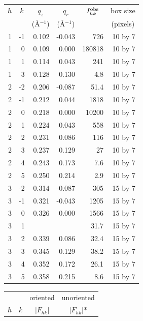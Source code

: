 \begin{table}[htbp]
  \centering
  \begin{tabular}{rrrrrr}
    \hline
    \multicolumn{1}{c}{$h$} & \multicolumn{1}{c}{$k$} & \multicolumn{1}{c}{$q_z$} & \multicolumn{1}{c}{$q_r$} & \multicolumn{1}{c}{$I_{hk}^\textrm{obs}$} & \multicolumn{1}{c}{box size} \\
     & & \multicolumn{1}{c}{(\AA$^{-1}$)} & \multicolumn{1}{c}{(\AA$^{-1}$)} & & \multicolumn{1}{c}{(pixels)} \\ 
    \hline
    1 & -1 & 0.102 & -0.043 &    726 & 10 by 7 \\
    1 &  0 & 0.109 &  0.000 & 180818 & 10 by 7 \\
    1 &  1 & 0.114 &  0.043 &    241 & 10 by 7 \\
    1 &	 3 & 0.128 &	0.130 &	   4.8 & 10 by 7 \\
    2 &	-2 & 0.206 & -0.087 &	  51.4 & 10 by 7 \\
    2 &	-1 & 0.212 &	0.044 &	  1818 & 10 by 7 \\
    2 &  0 & 0.218 &	0.000 &  10200 & 10 by 7 \\
    2 &	 1 & 0.224 &  0.043	&    558 & 10 by 7 \\
    2	&  2 & 0.231 &  0.086	&	   116 & 10 by 7 \\
    2 &	 3 & 0.237 &  0.129	&	    27 & 10 by 7 \\
    2	&  4 & 0.243 &  0.173	&    7.6 & 10 by 7 \\
    2	&  5 & 0.250 &  0.214	&    2.9 & 10 by 7 \\
	  3 &	-2 & 0.314 & -0.087	&    305 & 15 by 7 \\
    3	& -1 & 0.321 & -0.043	&   1205 & 15 by 7 \\
    3	&  0 & 0.326 &  0.000	&   1566 & 15 by 7 \\
    3	&  1 &       &        &   31.7 & 15 by 7 \\
    3	&  2 & 0.339 &  0.086	&   32.4 & 15 by 7 \\
    3	&  3 & 0.345 &  0.129	&	  38.2 & 15 by 7 \\
    3	&  4 & 0.352 &  0.172	&	  26.1 & 15 by 7 \\
    3	&  5 & 0.358 &  0.215	&	   8.6 & 15 by 7 \\
    \hline
  \end{tabular}
  \quad
  \begin{tabular}{rrrr}
    \hline
     & & \multicolumn{1}{c}{oriented} & \multicolumn{1}{c}{unoriented} \\
    \multicolumn{1}{c}{$h$} & \multicolumn{1}{c}{$k$} & \multicolumn{1}{c}{$|F_{hk}|$} & \multicolumn{1}{c}{$|F_{hk}|$*} \\

\end{tabular}
\end{table}

